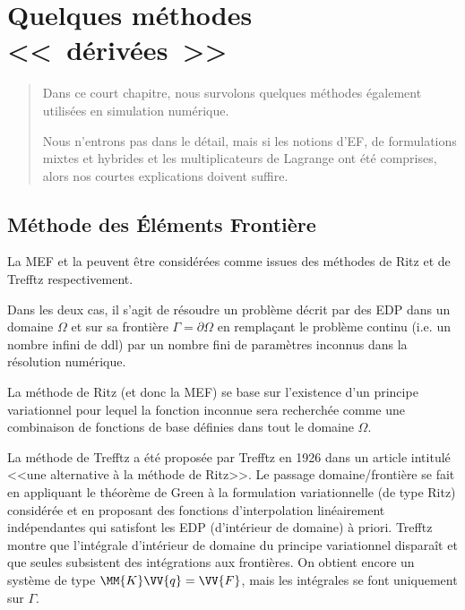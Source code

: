 \chapter{Quelques méthodes <<~dérivées~>>}\label{Ch-XFEM}
\begin{abstract}
Dans ce court chapitre, nous survolons quelques méthodes également utilisées
en simulation numérique.

Nous n'entrons pas dans le détail, mais si les notions d'EF, de formulations
mixtes et hybrides et les multiplicateurs de Lagrange ont été comprises, alors nos courtes
explications doivent suffire.
\end{abstract}


\medskip
\section{Méthode des Éléments Frontière}\label{Sec-BEM}

La MEF et la  
peuvent être
considérées comme issues des méthodes de Ritz 
et de Trefftz respectivement.

Dans les deux cas, il s'agit de résoudre un problème décrit par des EDP dans un
domaine $\Omega$ et sur sa frontière $\Gamma=\partial\Omega$ en remplaçant
le problème continu (i.e. un nombre infini de ddl) par un nombre fini de paramètres inconnus 
dans la résolution numérique.

\medskip
La méthode de Ritz (et donc la MEF) se base sur 
l'existence d'un principe variationnel pour lequel la fonction inconnue sera recherchée comme une 
combinaison de fonctions de base définies dans tout le domaine $\Omega$.

\medskip
La méthode de Trefftz a été proposée 
par Trefftz en 1926 dans un article intitulé <<une alternative à la méthode de Ritz>>. 
Le passage domaine/frontière se fait en appliquant le théorème de Green 
à la formulation variationnelle (de type Ritz) 
considérée et en proposant des fonctions d'interpolation linéairement indépendantes
qui satisfont les EDP (d'intérieur de domaine) à priori.
Trefftz montre que l'intégrale d'intérieur de domaine du principe variationnel disparaît et que
seules subsistent des intégrations aux frontières. 
On obtient encore un système de type $\MM{K}\VV{q}=\VV{F}$, mais les intégrales se font uniquement
sur $\Gamma$.

